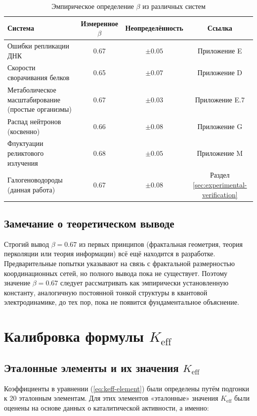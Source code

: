 \documentclass[12pt,a4paper]{article}
\theoremstyle{remark}
\newcommand{\Keff}{K_{\mathrm{eff}}}
\begin{document}
	\begin{table}[htbp]
		\centering
		\caption{Эмпирическое определение $\beta$ из различных систем}
		\label{tab:beta-empirical}
		\begin{tabular}{lccc}
			\toprule
			Система & Измеренное $\beta$ & Неопределённость & Ссылка \\
			\midrule
			Ошибки репликации ДНК & 0.67 & $\pm 0.05$ & Приложение E \\
			Скорости сворачивания белков & 0.65 & $\pm 0.07$ & Приложение D \\
			Метаболическое масштабирование (простые организмы) & 0.67 & $\pm 0.03$ & Приложение E.7 \\
			Распад нейтронов (косвенно) & 0.66 & $\pm 0.08$ & Приложение G \\
			Флуктуации реликтового излучения & 0.68 & $\pm 0.05$ & Приложение M \\
			Галогеноводороды (данная работа) & 0.67 & $\pm 0.08$ & Раздел \ref{sec:experimental-verification} \\
			\bottomrule
		\end{tabular}
	\end{table}
	
	\subsection{Замечание о теоретическом выводе}
	
	Строгий вывод $\beta = 0.67$ из первых принципов (фрактальная геометрия, теория перколяции или теория информации) всё ещё находится в разработке. Предварительные попытки указывают на связь с фрактальной размерностью координационных сетей, но полного вывода пока не существует. Поэтому значение $\beta = 0.67$ следует рассматривать как эмпирически установленную константу, аналогичную постоянной тонкой структуры в квантовой электродинамике, до тех пор, пока не появится фундаментальное объяснение.
	
	\section{Калибровка формулы $\Keff$}
	\label{sec:calibration}
	
	\subsection{Эталонные элементы и их значения $\Keff$}
	
	Коэффициенты в уравнении (\ref{eq:keff-element}) были определены путём подгонки к 20 эталонным элементам. Для этих элементов «эталонные» значения $\Keff$ были оценены на основе данных о каталитической активности, а именно:
	
\end{document}
